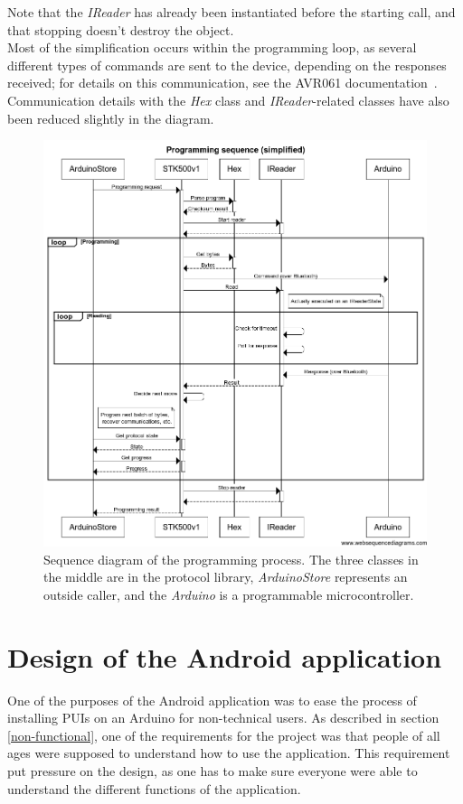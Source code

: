 	Note that the \textit{IReader} has already been instantiated before the starting call, and that stopping doesn't
	destroy the object.\\
	
	Most of the simplification occurs within the programming loop, as several different types of commands
	are sent to the device, depending on the responses received; for details on this communication, see the AVR061 documentation~\cite{AVR061}. Communication details with the \textit{Hex} class and \textit{IReader}-related classes have also been reduced slightly in the diagram.\\
	
	\begin{figure}[H]
	\hspace*{-1.0in}
	\includegraphics[scale=0.6]{images/Sequence_diagram.png}
	\caption[Sequence diagram for programming]{Sequence diagram of the programming process. The three classes in the middle are in the protocol library, \textit{ArduinoStore} represents an outside caller, and the \textit{Arduino} is a programmable microcontroller.}
	\label{fig:stk500_sequence_diagram}
	\end{figure}


\section{Design of the Android application}
One of the purposes of the Android application was to ease the process of installing PUIs on an Arduino for non-technical users. As described in section \ref{non-functional}, one of the requirements for the project was that people of all ages were supposed to understand how to use the application. This requirement put pressure on the design, as one has to make sure everyone were able to understand the different functions of the application.

